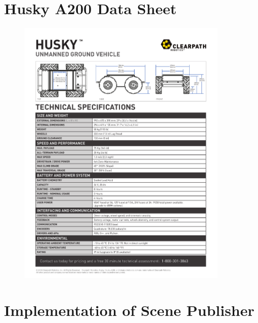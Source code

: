 \appendix

\chapter{Husky A200 Data Sheet}
\label{A:fig:husky_data_sheet}
\begin{figure}[H]
  \centering
  \includegraphics[width = 0.9\textwidth]{appendices/HUSKY_DATA_SHEET_Jan22.pdf}
\end{figure}


\chapter{Implementation of Scene Publisher}
\label{A:lst:ScenePublisher}
\UseRawInputEncoding
